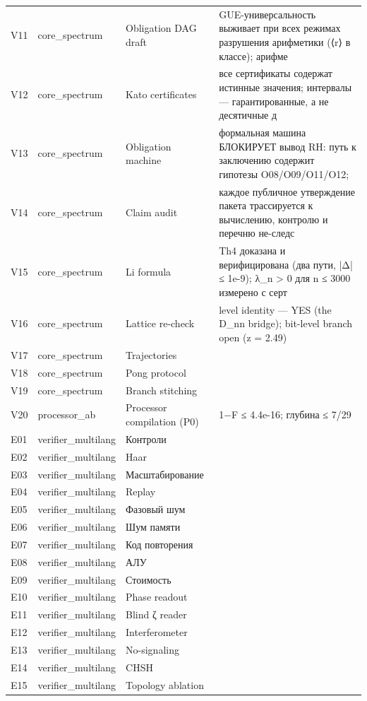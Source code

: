 \documentclass[11pt,a4paper]{article}
\begin{document}
\begin{table}[htbp]
\begin{tabular}{p{} p{} p{} p{}}
V11 & core\_spectrum & Obligation DAG draft & GUE-универсальность выживает при всех режимах разрушения арифметики (⟨r⟩ в классе); арифме \\
V12 & core\_spectrum & Kato certificates & все сертификаты содержат истинные значения; интервалы — гарантированные, а не десятичные д \\
V13 & core\_spectrum & Obligation machine & формальная машина БЛОКИРУЕТ вывод RH: путь к заключению содержит гипотезы O08/O09/O11/O12; \\
V14 & core\_spectrum & Claim audit & каждое публичное утверждение пакета трассируется к вычислению, контролю и перечню не-следс \\
V15 & core\_spectrum & Li formula & Th4 доказана и верифицирована (два пути, |Δ| ≤ 1e-9); λ\_n > 0 для n ≤ 3000 измерено с серт \\
V16 & core\_spectrum & Lattice re-check & level identity — YES (the D\_nn bridge); bit-level branch open (z = 2.49) \\
V17 & core\_spectrum & Trajectories &  \\
V18 & core\_spectrum & Pong protocol &  \\
V19 & core\_spectrum & Branch stitching &  \\
V20 & processor\_ab & Processor compilation (P0) & 1−F ≤ 4.4e-16; глубина ≤ 7/29 \\
E01 & verifier\_multilang & Контроли &  \\
E02 & verifier\_multilang & Haar &  \\
E03 & verifier\_multilang & Масштабирование &  \\
E04 & verifier\_multilang & Replay &  \\
E05 & verifier\_multilang & Фазовый шум &  \\
E06 & verifier\_multilang & Шум памяти &  \\
E07 & verifier\_multilang & Код повторения &  \\
E08 & verifier\_multilang & АЛУ &  \\
E09 & verifier\_multilang & Стоимость &  \\
E10 & verifier\_multilang & Phase readout &  \\
E11 & verifier\_multilang & Blind ζ reader &  \\
E12 & verifier\_multilang & Interferometer &  \\
E13 & verifier\_multilang & No-signaling &  \\
E14 & verifier\_multilang & CHSH &  \\
E15 & verifier\_multilang & Topology ablation &  \\

\end{tabular}
\end{table}
\end{document}
